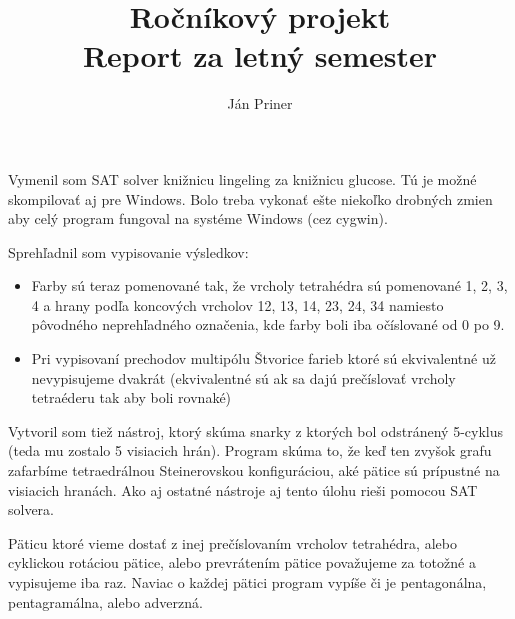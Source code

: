 \documentclass[a4paper, 11pt]{article}
\title{
    Ročníkový projekt \\
    \large Report za letný semester
}
\author{Ján Priner}
\date{}
\begin{document}
\maketitle

Vymenil som SAT solver knižnicu lingeling za knižnicu glucose. Tú je možné
skompilovať aj pre Windows. Bolo treba vykonať ešte niekoľko drobných zmien
aby celý program fungoval na systéme Windows (cez cygwin).

Sprehľadnil som vypisovanie výsledkov:
\begin{itemize}
\item
Farby sú teraz pomenované tak, že vrcholy tetrahédra sú pomenované 1, 2, 3, 4
a hrany podľa koncových vrcholov 12, 13, 14, 23, 24, 34 namiesto pôvodného
neprehľadného označenia, kde farby boli iba očíslované od 0 po 9.
\item
Pri vypisovaní prechodov multipólu Štvorice farieb ktoré sú ekvivalentné
už nevypisujeme dvakrát (ekvivalentné sú ak sa dajú prečíslovať vrcholy
tetraéderu tak aby boli rovnaké)
\end{itemize}

Vytvoril som tiež nástroj, ktorý skúma snarky z ktorých bol odstránený
5-cyklus (teda mu zostalo 5 visiacich hrán). Program skúma to, že keď ten
zvyšok grafu zafarbíme tetraedrálnou Steinerovskou konfiguráciou, aké
pätice sú prípustné na visiacich hranách. Ako aj ostatné nástroje aj tento
úlohu rieši pomocou SAT solvera.

Päticu ktoré vieme dostať z inej prečíslovaním
vrcholov tetrahédra, alebo cyklickou rotáciou pätice, alebo prevrátením pätice
považujeme za totožné a vypisujeme iba raz. Naviac o každej pätici program
vypíše či je pentagonálna, pentagramálna, alebo adverzná.
\end{document}
